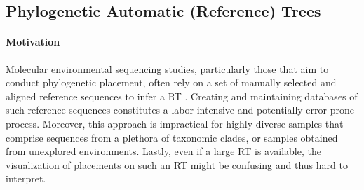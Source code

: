 
\subsection{Phylogenetic Automatic (Reference) Trees}
\label{ch:AutomaticTrees:sec:Methods:sub:PhAT}

\paragraph{Motivation}
\label{ch:AutomaticTrees:sec:Methods:sub:PhAT:par:Motivation}

Molecular environmental sequencing studies, particularly those that aim to conduct phylogenetic placement,
often rely on a set of manually selected and aligned reference sequences
to infer a \acf{RT} \cite{Tedersoo2014,DeVargas2015,Mahe2017,Thompson2017}. %
Creating and maintaining databases of such reference sequences constitutes a labor-intensive and potentially error-prone process.
Moreover, this approach is impractical for
highly diverse samples that comprise sequences from a plethora of taxonomic clades,
or samples obtained from unexplored environments.
Lastly, even if a large \ac{RT} is available,
the visualization of placements on such an \ac{RT} might be confusing and thus hard to interpret.

